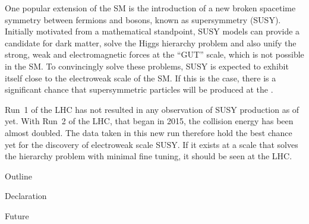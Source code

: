 One popular extension of the SM is the introduction of a new broken
spacetime symmetry between fermions and bosons, known as supersymmetry
(SUSY). Initially motivated from a mathematical standpoint, SUSY
models can provide a candidate for dark matter, solve the Higgs
hierarchy problem and also unify the
strong, weak and electromagnetic forces at the ``GUT''
scale, which is not possible in the SM. To convincingly solve
these problems, SUSY is expected to exhibit itself close to the electroweak scale
of the SM. If this is the case, there is a significant chance that
supersymmetric particles will be produced at the \LHC.

Run~1 of the LHC has not resulted in any observation of SUSY
production as of yet. With Run~2 of the LHC, that began in 2015, the
collision energy has been almost doubled. The data taken in this new
run therefore hold the best chance yet for the discovery of electroweak scale
SUSY. If it exists at a scale that solves the hierarchy problem with
minimal fine tuning, it should be seen at the LHC.

Outline 

Declaration

Future

%
